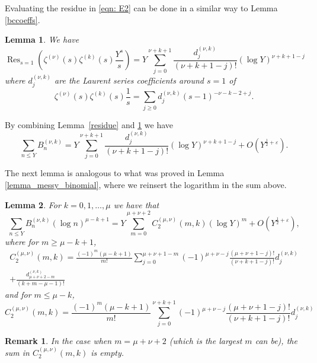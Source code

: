 \documentclass[12pt, a4paper,reqno]{amsart}
\DeclareMathOperator*{\res}{Res}
\newtheorem{lemma}{Lemma}
\newtheorem*{remark*}{Remark}
\theoremstyle{definition}
\numberwithin{equation}{section}
\begin{document}
Evaluating the residue in \eqref{eqn: E2} can be done in a similar way to Lemma \ref{bccoeffs}.

\begin{lemma}\label{lem:dcoeffs}
    We have \begin{equation*}
        \res_{s=1}\left(\zeta^{(\nu)}(s)\zeta^{(k)}(s)\frac{Y^s}{s}\right)=Y\sum_{j=0}^{\nu+k+1}\frac{d_{j}^{(\nu,k)} }{(\nu+k+1-j)!} (\log Y)^{\nu+k+1-j}
    \end{equation*}
    where $d_{j}^{(\nu,k)}$ are the Laurent series coefficients around $s=1$ of 
    \begin{equation*}
        \zeta^{(\nu)}(s)\zeta^{(k)}(s)\frac{1}{s}=\sum_{j\ge 0}d_{j}^{(\nu,k)}(s-1)^{-\nu-k-2+j}.
    \end{equation*}
\end{lemma}

By combining Lemma~\ref{residue} and \ref{lem:dcoeffs} we have \begin{equation*}
    \sum_{n\le Y}B_n^{(\nu,k)}=Y\sum_{j=0}^{\nu+k+1}\frac{d_{j}^{(\nu,k)} }{(\nu+k+1-j)!}(\log Y)^{\nu+k+1-j}+ O\left( Y^{\frac{1}{2}+\varepsilon}\right).
\end{equation*}

The next lemma is analogous to what was proved in  Lemma \ref{lemma_messy_binomial}, where we reinsert the logarithm in the sum above.

\begin{lemma}\label{messy_binomial_2}
    For $k=0,1,\dots,\mu$ we have that
    \begin{equation*}
        \sum_{n\le Y}B_n^{(\nu,k)}(\log n)^{\mu-k+1} = Y\sum_{m=0}^{\mu+\nu+2}C_2^{(\mu,\nu)}(m,k)(\log Y)^m + O\left( Y^{\frac{1}{2}+\varepsilon}\right),    
\end{equation*}
where for $m \geq \mu-k+1$,
\begin{multline*}
    C_2^{(\mu,\nu)}(m,k)=  \frac{(-1)^m(\mu-k+1)}{m!}\sum_{j=0}^{\mu+\nu+1-m} (-1)^{\mu+\nu-j} \frac{(\mu+\nu+1-j)!}{(\nu+k+1-j)!} d_{j}^{(\nu,k)} \\
    +\frac{d_{\mu+\nu+2-m}^{(\nu,k)}}{(k+m-\mu-1)!}
\end{multline*}
and for $m \leq \mu-k$,
\begin{equation*}
    C_2^{(\mu,\nu)}(m,k)=  \frac{(-1)^m(\mu-k+1)}{m!}\sum_{j=0}^{\nu+k+1} (-1)^{\mu+\nu-j} \frac{(\mu+\nu+1-j)!}{(\nu+k+1-j)!} d_{j}^{(\nu,k)}
\end{equation*}
\end{lemma}

\begin{remark*}
In the case when $m=\mu+\nu+2$ (which is the largest $m$ can be), the sum in $C_2^{(\mu,\nu)}(m,k)$ is empty.
\end{remark*}
\end{document}
